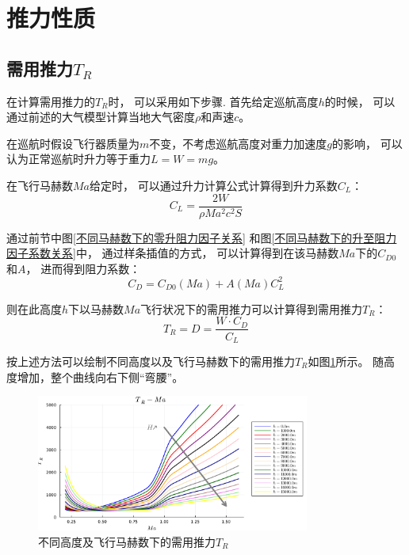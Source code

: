 \section{推力性质}

\subsection{需用推力$T_R$}

在计算需用推力的$T_R$时，
可以采用如下步骤.
首先给定巡航高度$h$的时候，
可以通过前述的大气模型计算当地大气密度$\rho$和声速$c$。

在巡航时假设飞行器质量为$m$不变，不考虑巡航高度对重力加速度$g$的影响，
可以认为正常巡航时升力等于重力$L = W = mg$。

在飞行马赫数$Ma$给定时，
可以通过升力计算公式计算得到升力系数$C_L$：
\begin{equation}
    C_L = \frac{2W}{ \rho Ma^2 c^2 S }
\end{equation}

通过前节中图\ref{不同马赫数下的零升阻力因子关系}
和图\ref{不同马赫数下的升至阻力因子系数关系}中，
通过样条插值的方式，
可以计算得到在该马赫数$Ma$下的$C_{D0}$和$A$，
进而得到阻力系数：
\begin{equation}
    C_D = C_{D0}(Ma) + A(Ma) C_L^2
\end{equation}

则在此高度$h$下以马赫数$Ma$飞行状况下的需用推力可以计算得到需用推力$T_R$：
\begin{equation}
    T_R = D = \frac{W\cdot C_D}{C_L}
\end{equation}

按上述方法可以绘制不同高度以及飞行马赫数下的需用推力$T_R$如图\ref{不同高度及飞行马赫数下的需用推力}所示。
随高度增加，整个曲线向右下侧“弯腰”。

\begin{figure}[H]
    \centering
    \includegraphics[width=0.8\textwidth]{image/ch4/H_TR_Ma.pdf}
    \caption{不同高度及飞行马赫数下的需用推力$T_R$}
    \label{不同高度及飞行马赫数下的需用推力}
\end{figure}


